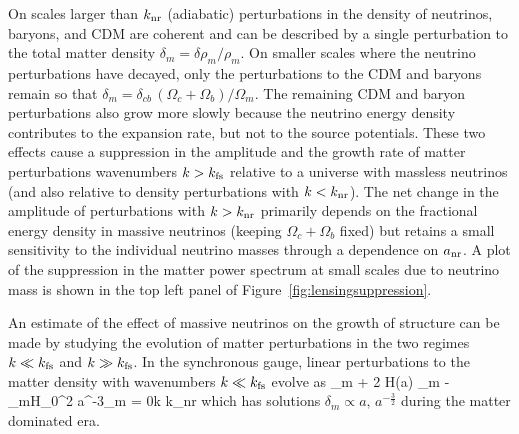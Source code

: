 On scales larger than $k_{\rm nr}$ (adiabatic) perturbations in the density of neutrinos, baryons, and CDM are coherent and can be described by a single perturbation to the total matter density $\delta_m= \delta \rho_m/\rho_m$. On smaller scales where the neutrino perturbations have decayed, only the perturbations to the CDM and baryons remain so that $\delta_{m} = \delta_{cb}\, (\Omega_{c} + \Omega_b)/\Omega_m $. The remaining CDM and baryon perturbations also grow more slowly because the neutrino energy density contributes to the expansion rate, but not to the source potentials. These two effects cause a suppression in the amplitude and the growth rate of matter perturbations wavenumbers $k > k_{\rm fs}$ relative to a universe with massless neutrinos (and also relative to density perturbations with $k<k_{\rm nr}$). The net change in the amplitude of perturbations with $k > k_{\rm nr}$ primarily depends on the fractional energy density in massive neutrinos (keeping $\Omega_c+\Omega_b$ fixed) but retains a small sensitivity to the individual neutrino masses through a dependence on $a_{\rm nr}$. A plot of the suppression in the matter power spectrum at small scales due to neutrino mass is shown in the top left panel of Figure~\ref{fig:lensingsuppression}.







An estimate of the effect of massive neutrinos on the growth of structure can be made by studying the evolution of matter perturbations in the two regimes $k\ll k_{\rm fs}$ and $k\gg k_{\rm fs}$.  In the synchronous gauge, linear perturbations to the matter density with wavenumbers $k \ll k_{\rm fs}$ evolve as
\beq
\label{eq:ddotdeltalarge}
\ddot{\delta}_m + 2 H(a) \dot\delta_m - \Omega_mH_0^2 a^{-3}\delta_m = 0\quad k \ll k_{\rm nr}
\eeq
which has solutions $\delta_m \propto a, \, a^{-\frac{3}{2}}$ during the matter dominated era. %

